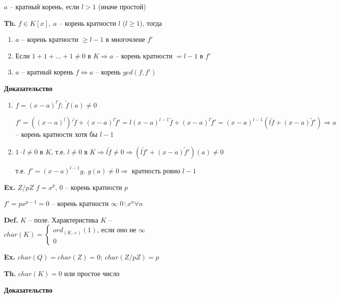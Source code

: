 \documentclass[14pt, letter paper]{article}
\begin{document}
$a$ -- кратный корень, если $l > 1$ (иначе простой)

\textbf{Th.} $f \in K[x],\ a$ -- корень кратности $l$ ($l \geq 1$), тогда

\begin{enumerate}
    \item $a$ -- корень кратности $\geq l -1$ в многочлене $f'$
    \item Если $1 + 1 + \ldots + 1 \neq 0$ в $K \Rightarrow a$ -- корень кратности $= l - 1$ в $f'$
    \item $a$ -- кратный корень $f \Leftrightarrow a$ -- корень $gcd(f, f')$
\end{enumerate}

\begin{center}
    \textbf{Доказательство}
\end{center}

\begin{enumerate}
    \item $f = (x - a)^l \tilde{f};\ \tilde{f}(a) \neq 0$

    $f' = ((x - a)^l)' \tilde{f} + (x - a)^l \tilde{f}' = l(x - a)^{l-1} \tilde{f} + (x - a)^l \tilde{f}' = (x - a)^{l-1}(l\tilde{f} + (x - a)\tilde{f}') \Rightarrow a$ -- корень кратности хотя бы $l - 1$

    \item $1 \cdot l \neq 0$ в $K$, т.е. $l \neq 0$ в $K \Rightarrow l\tilde{f} \neq 0 \Rightarrow (l\tilde{f}' + (x - a)\tilde{f}')(a) \neq 0$
    
    т.е. $f' = (x - a)^{l - 1} g,\ g(a) \neq 0 \Rightarrow$ кратность ровно $l - 1$
\end{enumerate}

\textbf{Ex.} $Z/pZ$ $f = x^p$, 0 -- корень кратности $p$

$f' = px^{p-1} = 0$ -- корень кратности $\infty$ $0 \, \vdots \, x^n \forall n$

\vspace{5mm}

\textbf{Def.} $K$ -- поле. Характеристика $K$ -- $char(K) = \begin{cases}
    ord_{(K, +)}(1) \text{, если оно не } \infty \\
    0
\end{cases}$

\textbf{Ex.} $char(Q) = char(Z) = 0;\ char(Z/pZ) = p$

\textbf{Th.} $char(K) = 0$ или простое число

\begin{center}
    \textbf{Доказательство}
\end{center}
\end{document}
